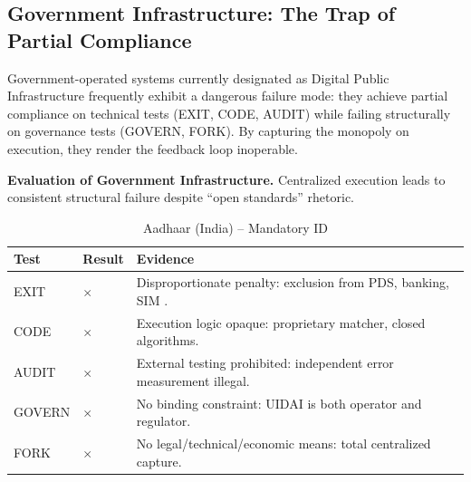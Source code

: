 \subsection{Government Infrastructure: The Trap of Partial Compliance}

Government-operated systems currently designated as Digital Public Infrastructure frequently exhibit a dangerous failure mode: they achieve partial compliance on technical tests (EXIT, CODE, AUDIT) while failing structurally on governance tests (GOVERN, FORK). By capturing the monopoly on execution, they render the feedback loop inoperable.

\begin{table}[htbp]
    \centering
    \caption{\textbf{Evaluation of Government Infrastructure.} Centralized execution leads to consistent structural failure despite ``open standards'' rhetoric.}
    \label{tab:govt_infra}

    \begin{subtable}{1\textwidth}
        \centering
        \caption{Aadhaar (India) -- Mandatory ID}
        \small
        \begin{tabular}{@{}llp{8.5cm}@{}}
            \toprule
            \textbf{Test} & \textbf{Result} & \textbf{Evidence} \\
            \midrule
            EXIT & $\times$ & Disproportionate penalty: exclusion from PDS, banking, SIM \citep{khera2019}. \\
            CODE & $\times$ & Execution logic opaque: proprietary matcher, closed algorithms. \\
            AUDIT & $\times$ & External testing prohibited: independent error measurement illegal. \\
            GOVERN & $\times$ & No binding constraint: UIDAI is both operator and regulator. \\
            FORK & $\times$ & No legal/technical/economic means: total centralized capture. \\
            \bottomrule
        \end{tabular}
        \vspace{0.3cm}
    \end{subtable}


\end{table}
